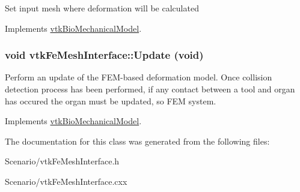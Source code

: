 Set input mesh where deformation will be calculated 

Implements \hyperlink{classvtkBioMechanicalModel_ac729eb24ed495e450a16ce369ad70f69}{vtkBioMechanicalModel}.\hypertarget{classvtkFeMeshInterface_a6d2c5a76db4549d74075c88691d03447}{
\subsubsection[{Update}]{\setlength{\rightskip}{0pt plus 5cm}void vtkFeMeshInterface::Update (void)}}
\label{classvtkFeMeshInterface_a6d2c5a76db4549d74075c88691d03447}


Perform an update of the FEM-\/based deformation model. Once collision detection process has been performed, if any contact between a tool and organ has occured the organ must be updated, so FEM system. 

Implements \hyperlink{classvtkBioMechanicalModel_a147f53dac1854b61f88330c59817b822}{vtkBioMechanicalModel}.

The documentation for this class was generated from the following files:\begin{DoxyCompactItemize}
\item 
Scenario/vtkFeMeshInterface.h\item 
Scenario/vtkFeMeshInterface.cxx\end{DoxyCompactItemize}
